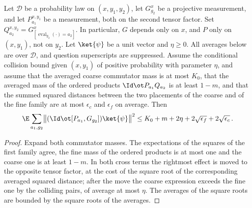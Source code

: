\begin{lemma}
	\label{lem:pasting-fine-commutator-mass}
	\leanok
	Let $\mathcal D$ be a probability law on $(x,y_1,y_2)$, let
	$G^x_{g_2}$ be a projective measurement, and let $P^{x,y_1}_{a_1}$ be a
	measurement, both on the second tensor factor. Set
	$Q^{x,y_2}_{a_2}=G^x_{[\operatorname{eval}_{y_2}(\cdot)=a_2]}$.
	In particular, $G$ depends only on $x$, and $P$ only on $(x,y_1)$,
	not on $y_2$. Let $\ket{\psi}$ be a unit vector and $\eta\geq0$.
	All averages below are over $\mathcal D$, and question superscripts are
	suppressed. Assume the conditional collision bound given $(x,y_1)$ of
	positive probability with parameter $\eta$, and assume that the averaged coarse
	commutator mass is at most $K_0$, that the averaged mass of the ordered
	products $\Id \ot P_{a_1} Q_{a_2}$ is at least $1 - m$, and that the summed
	squared distances between the two placements of the coarse and of the fine
	family are at most $\epsilon_c$ and $\epsilon_f$ on average. Then
	\[
		\E \sum_{a_1, g_2}
			\bigl\| (\Id \ot [P_{a_1}, G_{g_2}]) \ket{\psi} \bigr\|^2
			\le K_0 + m + 2\eta + 2\sqrt{\epsilon_f} + 2\sqrt{\epsilon_c}\,.
	\]
\end{lemma}
\begin{proof}
	\leanok
	Expand both commutator masses. The expectations of the squares of the first
	family agree, the fine mass of the ordered products is at most one and the
	coarse one is at least $1 - m$. In both cross terms the rightmost effect is
	moved to the opposite tensor factor, at the cost of the square root of the
	corresponding averaged squared distance; after the move the coarse
	expression exceeds the fine one by the colliding pairs, of average at most
	$\eta$. The averages of the square roots are bounded by the square roots of
	the averages.
\end{proof}

